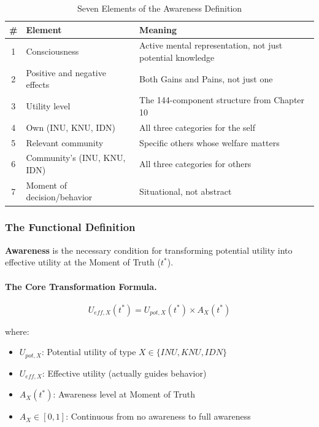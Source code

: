 \begin{table}[htbp]
\centering
\caption{Seven Elements of the Awareness Definition}
\label{tab:awareness-elements}
\renewcommand{\arraystretch}{1.4}
\begin{tabular}{@{}clp{7cm}@{}}
\toprule
\textbf{\#} & \textbf{Element} & \textbf{Meaning} \\
\midrule
1 & Consciousness & Active mental representation, not just potential knowledge \\
2 & Positive and negative effects & Both Gains and Pains, not just one \\
3 & Utility level & The 144-component structure from Chapter 10 \\
4 & Own (INU, KNU, IDN) & All three categories for the self \\
5 & Relevant community & Specific others whose welfare matters \\
6 & Community's (INU, KNU, IDN) & All three categories for others \\
7 & Moment of decision/behavior & Situational, not abstract \\
\bottomrule
\end{tabular}
\end{table}

\subsubsection{The Functional Definition}

\begin{definition}
\label{def:awareness-function}
\textbf{Awareness} is the necessary condition for transforming potential utility
into effective utility at the Moment of Truth ($t^*$).
\end{definition}

\paragraph{The Core Transformation Formula.}
\begin{equation}
\boxed{U_{eff,X}(t^*) = U_{pot,X}(t^*) \times A_X(t^*)}
\label{eq:awareness-transformation}
\end{equation}

where:
\begin{itemize}
\item $U_{pot,X}$: Potential utility of type $X \in \{INU, KNU, IDN\}$
\item $U_{eff,X}$: Effective utility (actually guides behavior)
\item $A_X(t^*)$: Awareness level at Moment of Truth
\item $A_X \in [0, 1]$: Continuous from no awareness to full awareness
\end{itemize}

